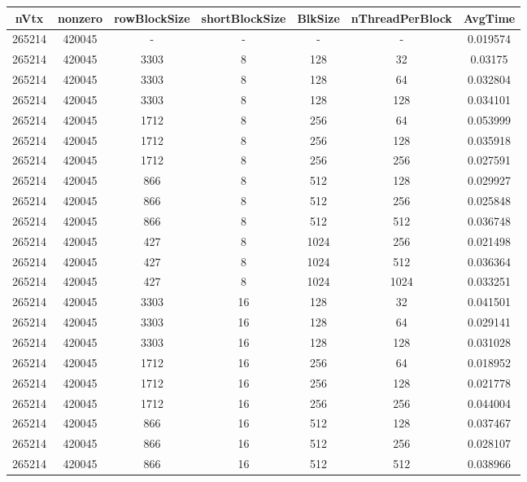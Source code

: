 \documentclass[9pt]{article}
\begin{document}
\SetBgPosition{0.25cm,-5.0cm}
\begin{tabular}{|c|c|c|c|c|c|c| }  
\hline
nVtx  & nonzero  & rowBlockSize  & shortBlockSize  & BlkSize  & nThreadPerBlock  & AvgTime \\
\hline
265214  & 420045  &  -  & -  & -  & -  &0.019574 \\
\hline
265214  & 420045  & 3303  & 8  & 128  & 32  & 0.03175 \\
\hline
265214  & 420045  & 3303  & 8  & 128  & 64  & 0.032804 \\
\hline
265214  & 420045  & 3303  & 8  & 128  & 128  & 0.034101 \\
\hline
265214  & 420045  & 1712  & 8  & 256  & 64  & 0.053999 \\
\hline
265214  & 420045  & 1712  & 8  & 256  & 128  & 0.035918 \\
\hline
265214  & 420045  & 1712  & 8  & 256  & 256  & 0.027591 \\
\hline
265214  & 420045  & 866  & 8  & 512  & 128  & 0.029927 \\
\hline
265214  & 420045  & 866  & 8  & 512  & 256  & 0.025848 \\
\hline
265214  & 420045  & 866  & 8  & 512  & 512  & 0.036748 \\
\hline
265214  & 420045  & 427  & 8  & 1024  & 256  & 0.021498 \\
\hline
265214  & 420045  & 427  & 8  & 1024  & 512  & 0.036364 \\
\hline
265214  & 420045  & 427  & 8  & 1024  & 1024  & 0.033251 \\
\hline
265214  & 420045  & 3303  & 16  & 128  & 32  & 0.041501 \\
\hline
265214  & 420045  & 3303  & 16  & 128  & 64  & 0.029141 \\
\hline
265214  & 420045  & 3303  & 16  & 128  & 128  & 0.031028 \\
\hline
265214  & 420045  & 1712  & 16  & 256  & 64  & 0.018952 \\
\hline
265214  & 420045  & 1712  & 16  & 256  & 128  & 0.021778 \\
\hline
265214  & 420045  & 1712  & 16  & 256  & 256  & 0.044004 \\
\hline
265214  & 420045  & 866  & 16  & 512  & 128  & 0.037467 \\
\hline
265214  & 420045  & 866  & 16  & 512  & 256  & 0.028107 \\
\hline
265214  & 420045  & 866  & 16  & 512  & 512  & 0.038966 \\

\end{tabular}
\end{document}
